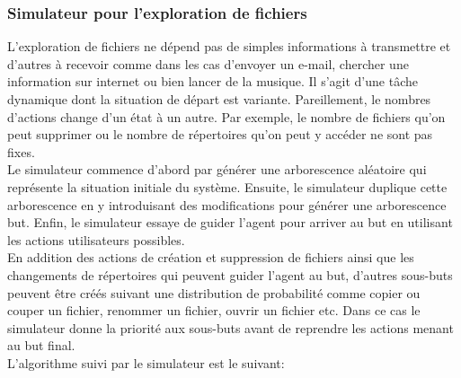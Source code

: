 \subsubsection*{Simulateur pour l'exploration de fichiers}
L'exploration de fichiers ne dépend pas de simples informations à transmettre et d'autres à recevoir comme dans les cas d'envoyer un e-mail, chercher une information sur internet ou bien lancer de la musique. Il s'agit d'une tâche dynamique dont la situation de départ est variante. Pareillement, le nombres d'actions change d'un état à un autre. Par exemple, le nombre de fichiers qu'on peut supprimer ou le nombre de répertoires qu'on peut y accéder ne sont pas fixes.\\
Le simulateur commence d'abord par générer une arborescence aléatoire qui représente la situation initiale du système. Ensuite, le simulateur duplique cette arborescence en y introduisant des modifications pour générer une arborescence but. Enfin, le simulateur essaye de guider l'agent pour arriver au but en utilisant les actions utilisateurs possibles.\\
En addition des actions de création et suppression de fichiers ainsi que les changements de répertoires qui peuvent guider l'agent au but, d'autres sous-buts peuvent être créés suivant une distribution de probabilité comme copier ou couper un fichier, renommer un fichier, ouvrir un fichier etc. Dans ce cas le simulateur donne la priorité aux sous-buts avant de reprendre les actions menant au but final.\\
L'algorithme suivi par le simulateur est le suivant:
\makeatletter
\def\BState{\State\hskip-\ALG@thistlm}
\makeatother

